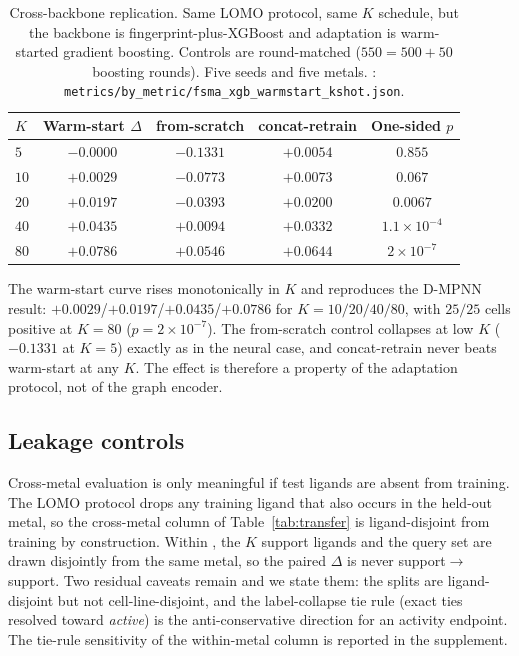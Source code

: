 \begin{table}[t]
\centering
\caption{Cross-backbone replication. Same \fsma{} LOMO protocol, same
$K$ schedule, but the backbone is fingerprint-plus-XGBoost and adaptation is
warm-started gradient boosting. Controls are round-matched ($550 = 500 + 50$
boosting rounds). Five seeds and five metals. \MEASURED:
\texttt{metrics/by\_metric/fsma\_xgb\_warmstart\_kshot.json}.}
\label{tab:backbone}
\small
\begin{tabular}{lcccc}
\toprule
$K$ & Warm-start $\Delta$ & from-scratch & concat-retrain & One-sided $p$ \\
\midrule
$5$  & $-0.0000$ & $-0.1331$ & $+0.0054$ & $0.855$ \\
$10$ & $+0.0029$ & $-0.0773$ & $+0.0073$ & $0.067$ \\
$20$ & $+0.0197$ & $-0.0393$ & $+0.0200$ & $0.0067$ \\
$40$ & $+0.0435$ & $+0.0094$ & $+0.0332$ & $1.1\times10^{-4}$ \\
$80$ & $+0.0786$ & $+0.0546$ & $+0.0644$ & $2\times10^{-7}$ \\
\bottomrule
\end{tabular}
\end{table}

The warm-start curve rises monotonically in $K$ and reproduces the D-MPNN
result: $+0.0029$/$+0.0197$/$+0.0435$/$+0.0786$ for $K{=}10/20/40/80$, with
$25/25$ cells positive at $K{=}80$ ($p=2\times10^{-7}$). The from-scratch
control collapses at low $K$ ($-0.1331$ at $K{=}5$) exactly as in the neural
case, and concat-retrain never beats warm-start at any $K$. The \fsma{} effect
is therefore a property of the adaptation protocol, not of the graph encoder.

\subsection{Leakage controls}
\label{sec:ablation:leak}

Cross-metal evaluation is only meaningful if test ligands are absent from
training. The LOMO protocol drops any training ligand that also occurs in the
held-out metal, so the cross-metal column of Table~\ref{tab:transfer} is
ligand-disjoint from training by construction. Within \fsma{}, the $K$ support
ligands and the query set are drawn disjointly from the same metal, so the
paired $\Delta$ is never support$\to$support. Two residual caveats remain and we
state them: the splits are ligand-disjoint but not cell-line-disjoint, and the
label-collapse tie rule (exact ties resolved toward \emph{active}) is the
anti-conservative direction for an activity endpoint. The tie-rule sensitivity
of the within-metal column is reported in the supplement.
